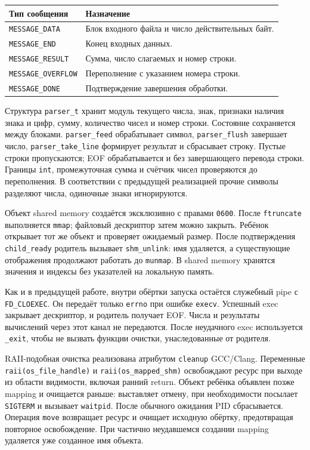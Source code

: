 \documentclass[12pt,a4paper,oneside,fleqn]{article}
\begin{document}
\begin{center}\small
\begin{tabularx}{\textwidth}{lX}
\toprule Тип сообщения & Назначение\\\midrule
\texttt{MESSAGE\_DATA} & Блок входного файла и число действительных байт.\\
\texttt{MESSAGE\_END} & Конец входных данных.\\
\texttt{MESSAGE\_RESULT} & Сумма, число слагаемых и номер строки.\\
\texttt{MESSAGE\_OVERFLOW} & Переполнение с указанием номера строки.\\
\texttt{MESSAGE\_DONE} & Подтверждение завершения обработки.\\\bottomrule
\end{tabularx}\end{center}

Структура \texttt{parser\_t} хранит модуль текущего числа, знак, признаки наличия
знака и цифр, сумму, количество чисел и номер строки. Состояние сохраняется
между блоками. \texttt{parser\_feed} обрабатывает символ,
\texttt{parser\_flush} завершает число, \texttt{parser\_take\_line} формирует
результат и сбрасывает строку. Пустые строки пропускаются; EOF обрабатывается
и без завершающего перевода строки. Границы \texttt{int}, промежуточная сумма
и счётчик чисел проверяются до переполнения. В соответствии с предыдущей
реализацией прочие символы разделяют числа, одиночные знаки игнорируются.

Объект shared memory создаётся эксклюзивно с правами \texttt{0600}. После
\texttt{ftruncate} выполняется \texttt{mmap}; файловый дескриптор затем можно
закрыть. Ребёнок открывает тот же объект и проверяет ожидаемый размер.
После подтверждения \texttt{child\_ready} родитель вызывает \texttt{shm\_unlink}:
имя удаляется, а существующие отображения продолжают работать до \texttt{munmap}.
В shared memory хранятся значения и индексы без указателей на локальную память.

Как и в предыдущей работе, внутри обёртки запуска остаётся служебный pipe
с \texttt{FD\_CLOEXEC}. Он передаёт только \texttt{errno} при ошибке \texttt{execv}.
Успешный exec закрывает дескриптор, и родитель получает EOF. Числа и результаты
вычислений через этот канал не передаются. После неудачного exec используется
\texttt{\_exit}, чтобы не вызвать функции очистки, унаследованные от родителя.

RAII-подобная очистка реализована атрибутом \texttt{cleanup} GCC/Clang.
Переменные \texttt{raii(os\_file\_handle)} и \texttt{raii(os\_mapped\_shm)}
освобождают ресурс при выходе из области видимости, включая ранний return.
Объект ребёнка объявлен позже mapping и очищается раньше: выставляет отмену,
при необходимости посылает \texttt{SIGTERM} и вызывает \texttt{waitpid}.
После обычного ожидания PID сбрасывается. Операция \texttt{move} возвращает
ресурс и очищает исходную обёртку, предотвращая повторное освобождение.
При частично неудавшемся создании mapping удаляется уже созданное имя объекта.
\end{document}

